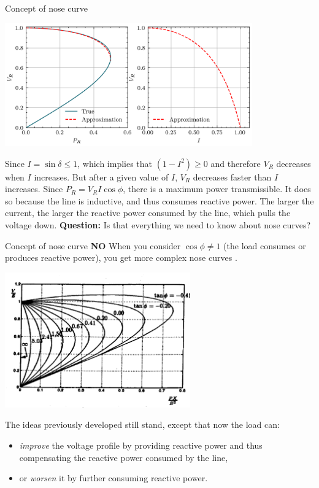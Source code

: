 \begin{frame}{Concept of nose curve}
\begin{center}
\includegraphics[width=0.8\textwidth]{images/NoseCurveApprox.png}
\end{center}
Since $I=\sin \delta \leq 1$, which implies that $(1-I^2) \geq 0$ and therefore $V_R$ decreases when $I$ increases. But after a given value of $I$, $V_R$ decreases faster than $I$ increases. Since $P_R = V_R I \cos{\phi}$, there is a maximum power transmissible.
It does so because the line is inductive, and thus consumes reactive power. The larger the current, the larger the reactive power consumed by the line, which pulls the voltage down.
\textbf{Question:} Is that everything we need to know about nose curves?
\end{frame}

\begin{frame}{Concept of nose curve}
\textbf{NO}
When you consider $\cos \phi \neq 1$ (the load consumes or produces reactive power), you get more complex nose curves \cite{van2007voltage}.
\begin{center}
\includegraphics[width=0.6\textwidth]{images/TrueNoseCurve.png}
\end{center}
The ideas previously developed still stand, except that now the load can:
\begin{itemize}
    \item \emph{improve} the voltage profile by providing reactive power and thus compensating the reactive power consumed by the line,
    \item or \emph{worsen} it by further consuming reactive power.
\end{itemize}
\end{frame}


